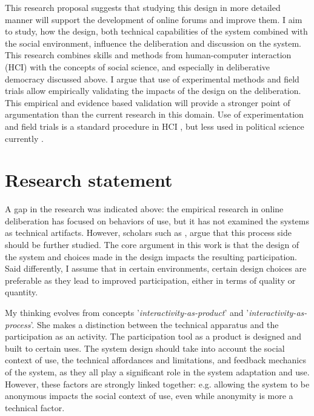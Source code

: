 \documentclass{article}
\begin{document}
This research proposal suggests that studying this design in more detailed manner will support the development of online forums and improve them. I aim to study, how the design, both technical capabilities of the system combined with the social environment, influence the deliberation and discussion on the system. This research combines skills and methods from human-computer interaction (HCI) with the concepts of social science, and especially in deliberative democracy discussed above. I argue that use of experimental methods and field trials allow empirically validating the impacts of the design on the deliberation. This empirical and evidence based validation will provide a stronger point of argumentation than the current research in this domain. Use of experimentation and field trials is a standard procedure in HCI , but less used in political science currently .


\section{Research statement}

A gap in the research was indicated above: the empirical research in online deliberation has focused on behaviors of use, but it has not examined the systems as technical artifacts. However, scholars such as , argue that this process side should be further studied. The core argument in this work is that the design of the system and choices made in the design impacts the resulting participation. Said differently, I assume that in certain environments, certain design choices are preferable as they lead to improved participation, either in terms of quality or quantity.

My thinking evolves from  concepts '\textit{interactivity-as-product}' and '\textit{interactivity-as-process}'. She makes a distinction between the technical apparatus and the participation as an activity. The participation tool as a product is designed and built to certain uses. The system design should take into account the social context of use, the technical affordances and limitations, and feedback mechanics of the system, as they all play a significant role in the system adaptation and use. However, these factors are strongly linked together: e.g. allowing the system to be anonymous impacts the social context of use, even while anonymity is more a technical factor.
\end{document}
